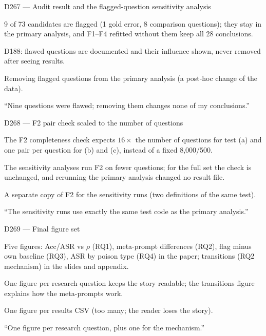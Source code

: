 \documentclass[11pt,a4paper]{report}
\begin{document}
\begin{decisionbox}{D267 --- Audit result and the flagged-question sensitivity analysis}
\begin{description}[nosep, leftmargin=0pt]
  \item[Decision.] 9 of 73 candidates are flagged (1 gold error, 8 comparison questions); they stay in the primary analysis, and F1--F4 refitted without them keep all 28 conclusions.
  \item[Why.] D188: flawed questions are documented and their influence shown, never removed after seeing results.
  \item[Alternatives.] Removing flagged questions from the primary analysis (a post-hoc change of the data).
  \item[Interview line.] ``Nine questions were flawed; removing them changes none of my conclusions.''
\end{description}
\end{decisionbox}

\begin{decisionbox}{D268 --- F2 pair check scaled to the number of questions}
\begin{description}[nosep, leftmargin=0pt]
  \item[Decision.] The F2 completeness check expects $16\times$ the number of questions for test (a) and one pair per question for (b) and (c), instead of a fixed 8{,}000/500.
  \item[Why.] The sensitivity analyses run F2 on fewer questions; for the full set the check is unchanged, and rerunning the primary analysis changed no result file.
  \item[Alternatives.] A separate copy of F2 for the sensitivity runs (two definitions of the same test).
  \item[Interview line.] ``The sensitivity runs use exactly the same test code as the primary analysis.''
\end{description}
\end{decisionbox}
\begin{decisionbox}{D269 --- Final figure set}
\begin{description}[nosep, leftmargin=0pt]
  \item[Decision.] Five figures: Acc/ASR vs $\rho$ (RQ1), meta-prompt differences (RQ2), flag minus own baseline (RQ3), ASR by poison type (RQ4) in the paper; transitions (RQ2 mechanism) in the slides and appendix.
  \item[Why.] One figure per research question keeps the story readable; the transitions figure explains how the meta-prompts work.
  \item[Alternatives.] One figure per results CSV (too many; the reader loses the story).
  \item[Interview line.] ``One figure per research question, plus one for the mechanism.''
\end{description}
\end{decisionbox}
\end{document}
